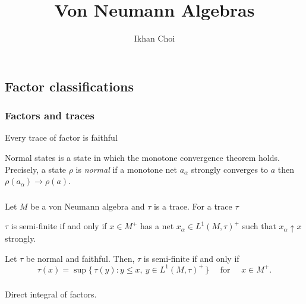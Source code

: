 \documentclass{../../large}
\begin{document}
\title{Von Neumann Algebras}
\author{Ikhan Choi}
\maketitle
\tableofcontents




\part{}

\chapter{Factor classifications}


\section{Factors and traces}


Every trace of factor is faithful

\begin{prb}
Normal states is a state in which the monotone convergence theorem holds.
Precisely, a state $\rho$ is \emph{normal} if a monotone net $a_\alpha$ strongly converges to $a$ then $\rho(a_\alpha)\to\rho(a)$.
\end{prb}


\section{}
\begin{prb}
Let $M$ be a von Neumann algebra and $\tau$ is a trace.
For a trace $\tau$
\begin{parts}
\item $\tau$ is semi-finite if and only if $x\in M^+$ has a net $x_\alpha\in L^1(M,\tau)^+$ such that $x_\alpha\uparrow x$ strongly.
\item Let $\tau$ be normal and faithful. Then, $\tau$ is semi-finite if and only if
\[\tau(x)=\sup\{\,\tau(y):y\le x,\ y\in L^1(M,\tau)^+\,\}\quad\text{ for }\quad x\in M^+.\]
\end{parts}
\end{prb}

\section{}


Direct integral of factors.
\end{document}
